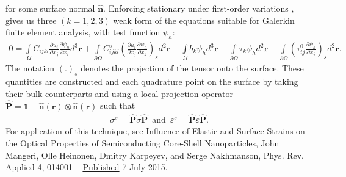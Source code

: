 \documentclass[16pt]{article} %
\begin{document}
%
for some surface normal $\mathbf{\hat{n}}$.
%
Enforcing stationary under first-order variations \cite{BowerBook}, gives us three $(k = 1,2,3)$ weak form of the equations suitable for Galerkin finite element analysis, with test function $\psi_h$:
%
\begin{align}\tag{3.8}
 0 = \int\limits_\Omega C_{ijkl} \frac{\partial u_i}{\partial x_j} \frac{\partial \psi_h}{\partial x_l} d^3 \textbf{r} + \int\limits_{\partial \Omega} C_{ijkl}^s \left(\frac{\partial u_i}{\partial x_j} \frac{\partial \psi_h}{\partial x_k} \right)_s d^2 \textbf{r} - \int\limits_\Omega b_k \psi_h d^3 \textbf{r} - \int\limits_{\partial \Omega} \tau_k \psi_h d^2 \textbf{r} + \int\limits_{\partial \Omega} \left(\tau_{ij}^0 \frac{\partial \psi_h}{\partial x_j} \right)_s d^2 \textbf{r}.
\end{align}
%
The notation $\left( . \right)_s$ denotes the projection of the tensor onto the surface.
%
These quantities are constructed and each quadrature point on the surface by taking their bulk counterparts and using a local projection operator $\mathbf{\hat{\textbf{P}}} = \mathds{1} - \mathbf{\hat{n}}(\textbf{r}) \otimes \mathbf{\hat{n}} (\textbf{r})$ \cite{Yvonnet2012} such that 
%
\begin{align}\tag{3.9}
\sigma^s = \mathbf{\hat{\textbf{P}}} \sigma \mathbf{\hat{\textbf{P}}} \,\,\,\mathrm{and}\,\,\, \varepsilon^s = \mathbf{\hat{\textbf{P}}} \varepsilon \mathbf{\hat{\textbf{P}}}.
\end{align}
%
For application of this technique, see Influence of Elastic and Surface Strains on the Optical Properties of Semiconducting Core-Shell Nanoparticles,
John Mangeri, Olle Heinonen, Dmitry Karpeyev, and Serge Nakhmanson, Phys. Rev. Applied 4, 014001 -- \href{http://journals.aps.org/prapplied/abstract/10.1103/PhysRevApplied.4.014001}{Published}  7 July 2015. 
%

%
\end{document}
